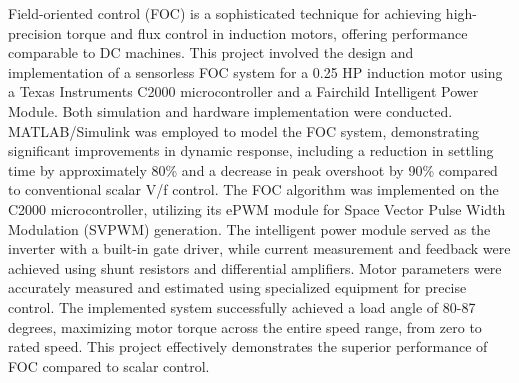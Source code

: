 
\setcounter{page}{1}



Field-oriented control (FOC) is a sophisticated technique for achieving high-precision torque and flux control in induction motors, offering performance comparable to DC machines. This project involved the design and implementation of a sensorless FOC system for a 0.25 HP induction motor using a Texas Instruments C2000 microcontroller and a Fairchild Intelligent Power Module. Both simulation and hardware implementation were conducted. MATLAB/Simulink was employed to model the FOC system, demonstrating significant improvements in dynamic response, including a reduction in settling time by approximately 80\% and a decrease in peak overshoot by 90\% compared to conventional scalar V/f control. The FOC algorithm was implemented on the C2000 microcontroller, utilizing its ePWM module for Space Vector Pulse Width Modulation (SVPWM) generation. The intelligent power module served as the inverter with a built-in gate driver, while current measurement and feedback were achieved using shunt resistors and differential amplifiers. Motor parameters were accurately measured and estimated using specialized equipment for precise control. The implemented system successfully achieved a load angle of 80-87 degrees, maximizing motor torque across the entire speed range, from zero to rated speed. This project effectively demonstrates the superior performance of FOC compared to scalar control. 




\newpage